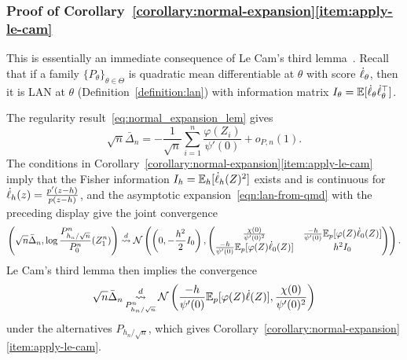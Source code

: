 \subsubsection*{Proof of
  Corollary~\ref{corollary:normal-expansion}\eqref{item:apply-le-cam}}

This is essentially an immediate consequence of Le Cam's third
lemma~\cite[Example 6.7]{VanDerVaart98}.
Recall~\cite[Thm.~7.2]{VanDerVaart98} that if
a family $\{P_\theta\}_{\theta \in \Theta}$ is quadratic mean differentiable
at $\theta$ with score $\dot{\ell}_\theta$, then
it is LAN at $\theta$ (Definition~\ref{definition:lan})
with information matrix $I_\theta = \mathbb{E}[\dot{\ell}_\theta \dot{\ell}_\theta^\top]$.




The regularity result~\eqref{eq:normal_expansion_lem} gives
\begin{equation*}
  \sqrt{n} \bar{\Delta}_n = -\frac{1}{\sqrt{n}}
  \sum_{i = 1}^n  \frac{\varphi(Z_i)}{\psi'(0)} + o_{P,n}(1).
\end{equation*}
The conditions in
Corollary~\ref{corollary:normal-expansion}\eqref{item:apply-le-cam} imply
that the Fisher information $I_h =
\mathbb{E}_h[\dot{\ell}_h(Z)^2]$ exists and is continuous for
$\dot{\ell}_h(z) = \frac{p'(z - h)}{p(z - h)}$,
and the asymptotic expansion~\eqref{eqn:lan-from-qmd}
with the preceding display give the joint convergence
\begin{equation*}
  \left(\sqrt{n} \bar{\Delta}_n, \log \frac{P^n_{h_n/\sqrt{n}}}{P^n_0}(Z_1^n)
  \right)
  \stackrel{d}{\rightsquigarrow} \mathcal{N} \left( \left(0,-\frac{h^2}{2} I_0 \right),
  \begin{pmatrix}
    \frac{\chi(0)}{\psi'(0)^2} & \frac{-h}{ \psi'(0)}
    \mathbb{E}_p[\varphi(Z) \dot{\ell}_0(Z)] \\
    \frac{-h}{ \psi'(0)} \mathbb{E}_p[\varphi(Z) \dot{\ell}_0(Z)]
    & h^2 I_0
  \end{pmatrix}  \right).
\end{equation*}
Le Cam's third lemma \cite[Exm. 6.7]{VanDerVaart98} then implies the
convergence
\begin{equation*}
  \sqrt{n}\bar{\Delta}_n
  \mathop{\stackrel{d}{\rightsquigarrow}}_{P_{h_n/\sqrt{n}}^n}
  \mathcal{N}\left(\frac{-h}{ \psi'(0)} \mathbb{E}_p[\varphi(Z) \dot{\ell}(Z)],
  \frac{\chi(0)}{\psi'(0)^2} \right)
\end{equation*}
under the alternatives $P_{h_n/\sqrt{n}}$, which gives
Corollary~\ref{corollary:normal-expansion}\eqref{item:apply-le-cam}.

